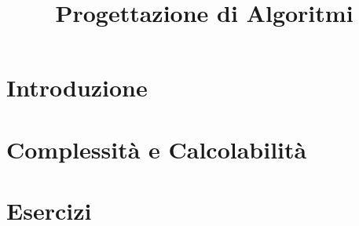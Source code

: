 
\usepackage{algorithm}
\usepackage{algpseudocode}

\renewcommand{\algorithmicrequire}{\textbf{Input:}}
\renewcommand{\algorithmicensure}{\textbf{Output:}}



\title{Progettazione di Algoritmi}

\maketitle

\newpage

\tableofcontents
\newpage

\listofalgorithms
\newpage

\chapter{Introduzione}



\clearpage

\chapter{Complessit\`a e Calcolabilit\`a}



\clearpage

\chapter{Esercizi}



\clearpage

